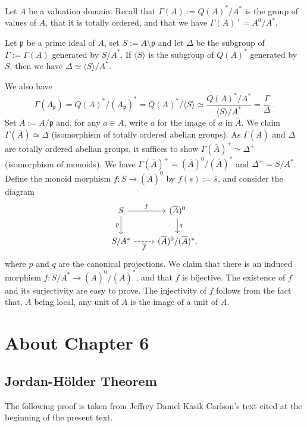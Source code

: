 \documentclass[parskip=half,fontsize=12pt]{scrartcl}%
\newcommand{\mf}{\mathfrak}
\newcommand{\ppp}{\mf p}
\begin{document}
Let $A$ be a valuation domain. Recall that $\Gamma(A):=Q(A)^*/A^*$ is the group of values of $A$, that it is totally ordered, and that we have $\Gamma(A)^+=A^0/A^*$. 

Let $\ppp$ be a prime ideal of $A$, set $S:=A\setminus\ppp$ and let $\Delta$ be the subgroup of $\Gamma:=\Gamma(A)$ generated by $S/A^*$. If $\langle S\rangle$ is the subgroup of $Q(A)^*$ generated by $S$, then we have $\Delta\simeq\langle S\rangle/A^*$.

We also have 
$$
\Gamma(A_\ppp)=Q(A)^*/(A_\ppp)^*=Q(A)^*/\langle S\rangle\simeq\frac{Q(A)^*/A^*}{\langle S\rangle/A^*}=\frac{\Gamma}{\Delta}\ .
$$ 
Set $\overline A:=A/\ppp$ and, for any $a\in A$, write $\overline a$ for the image of $a$ in $\overline A$. We claim $\Gamma(\overline A)\simeq\Delta$ (isomorphism of totally ordered abelian groups). As $\Gamma(\overline A)$ and $\Delta$ are totally ordered abelian groups, it suffices to show $\Gamma(\overline A)^+\simeq\Delta^+$ (isomorphism of monoids). We have $\Gamma(\overline A)^+=(\overline A)^0/(\overline A)^*$ and $\Delta^+=S/A^*$. Define the monoid morphism $f:S\to(\overline A)^0$ by $f(s):=\overline s$, and consider the diagram 
$$
\begin{tikzcd}
S\ar[r,"f"]\ar[d,"p"']&(\overline A)^0\ar[d,"q"]\\ 
S/A^*\ar[r,dashrightarrow,"\overline f"']&(\overline A)^0/(\overline A)^*,
\end{tikzcd}
$$ 
where $p$ and $q$ are the canonical projections. We claim that there is an induced morphism $\overline f:S/A^*\to(\overline A)^0/(\overline A)^*$, and that $\overline f$ is bijective. The existence of $\overline f$ and its surjectivity are easy to prove. The injectivity of $\overline f$ follows from the fact that, $A$ being local, any unit of $\overline A$ is the image of a unit of $A$.

\section{About Chapter 6}%

\subsection{Jordan-Hölder Theorem}%

The following proof is taken from Jeffrey Daniel Kasik Carlson's text cited at the beginning of the present text. 
\end{document}
